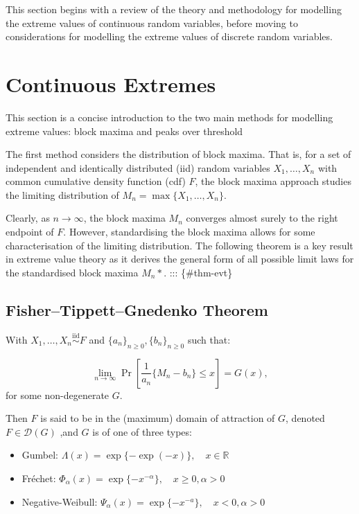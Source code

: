 \documentclass[
  10pt,
  a4paper,
]{scrreprt}
\providecommand{\tightlist}{%
  \setlength{\itemsep}{0pt}\setlength{\parskip}{0pt}}\usepackage{longtable,booktabs,array}
\theoremstyle{definition}
\theoremstyle{plain}
\theoremstyle{plain}
\theoremstyle{plain}
\theoremstyle{remark}
\begin{document}
{This section begins with a review of the theory and methodology for
modelling the extreme values of continuous random variables, before
moving to considerations for modelling the extreme values of discrete
random variables.

\hypertarget{sec-ce}{%
\section{Continuous Extremes}\label{sec-ce}}

This section is a concise introduction to the two main methods for
modelling extreme values: block maxima and peaks over threshold

The first method considers the distribution of block maxima. That is,
for a set of independent and identically distributed (iid) random
variables \(X_1,\ldots,X_n\) with common cumulative density function
(cdf) \(F\), the block maxima approach studies the limiting distribution
of \(M_n = \max\{X_1,\ldots,X_n\}\).

Clearly, as \(n\rightarrow \infty\), the block maxima \(M_n\) converges
almost surely to the right endpoint of \(F\). However, standardising the
block maxima allows for some characterisation of the limiting
distribution. The following theorem is a key result in extreme value
theory as it derives the general form of all possible limit laws for the
standardised block maxima \(M_n*\). ::: \{\#thm-evt\}

\hypertarget{fishertippettgnedenko-theorem}{%
\subsection{Fisher--Tippett--Gnedenko
Theorem}\label{fishertippettgnedenko-theorem}}

With \(X_1, \ldots,X_n \overset{\mathrm{iid}}{\sim} F\) and
\(\{ a_n\}_{n\ge0}, \{ b_n\}_{n\ge0}\) such that:

\[\lim_{n\rightarrow\infty}\Pr\left[\displaystyle\frac{1}{a_n}\{M_n-b_n\}\le x\right] = G(x),\]
for some non-degenerate \(G\).

Then \(F\) is said to be in the (maximum) domain of attraction of \(G\),
denoted \(F\in\mathcal D(G)\) ,and \(G\) is of one of three types:

\begin{itemize}
\tightlist
\item
  Gumbel: \(\Lambda(x) = \exp\{-\exp(-x)\},\quad x \in \mathbb R\)
\item
  Fréchet:
  \(\Phi_\alpha(x) = \exp\{-x^{-\alpha}\},\quad x\ge 0,\alpha>0\)
\item
  Negative-Weibull:
  \(\Psi_\alpha(x) = \exp\{-x^{-a}\},\quad x<0,\alpha>0\)
\end{itemize}

}
\end{document}
